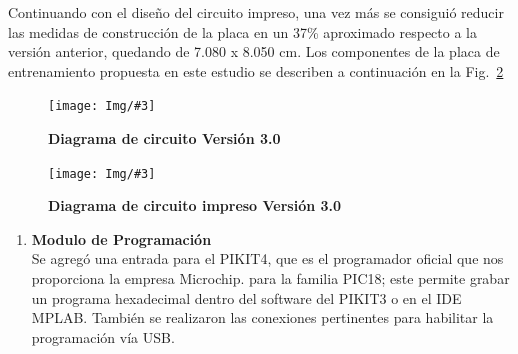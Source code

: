 \documentclass[times, 10pt,twocolumn]{article}
\newcommand{\Img}[5]{
   \begin{figure}[H]
   	   \centering
       \texttt{[image: Img/\#3]}
       \caption{ \centering \textbf{\small #4}}
       \label{#5}
       \end{figure}
   }
\begin{document}
Continuando con el diseño del circuito impreso, una vez más se consiguió reducir las medidas de construcción de la placa en un 37\% aproximado respecto a la versión anterior, quedando de 7.080 x 8.050 cm. Los componentes de la placa de entrenamiento propuesta en este estudio se describen a continuación en la Fig.~\ref{fig:10}
\Img{8.5cm}{7.0cm}{Tercera_Version}{Diagrama de circuito Versión 3.0}{fig:9}
\Img{7.5cm}{7.0cm}{tercera_version_pcb}{Diagrama de circuito impreso Versión 3.0}{fig:10}
\begin{enumerate}[label=\emph{\Alph*.}] 
  \item \textbf{Modulo de Programación}\\ Se agregó una entrada para el PIKIT4, que es el programador oficial que nos proporciona la empresa Microchip. para la familia PIC18; este permite grabar un programa hexadecimal dentro del software del PIKIT3 o en el IDE MPLAB. También se realizaron las conexiones pertinentes para habilitar la  programación vía USB.
 

\end{enumerate}
\end{document}
